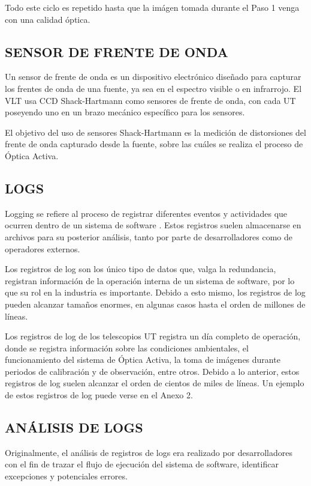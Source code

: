 Todo este ciclo es repetido hasta que la imágen tomada durante el Paso 1 venga con una calidad óptica\cite{wilson1987active}.

\subsection{SENSOR DE FRENTE DE ONDA}
Un sensor de frente de onda es un dispositivo electrónico diseñado para capturar los frentes de onda de una fuente, ya sea en el espectro visible o en infrarrojo. El VLT usa CCD Shack-Hartmann como sensores de frente de onda, con cada UT poseyendo uno en un brazo mecánico específico para los sensores.\cite{eso1998vlt}

El objetivo del uso de sensores Shack-Hartmann es la medición de distorsiones del frente de onda capturado desde la fuente, sobre las cuáles se realiza el proceso de Óptica Activa.\cite{eso1998vlt}

\subsection{LOGS}
Logging se refiere al proceso de registrar diferentes eventos y actividades que ocurren dentro de un sistema de software \cite{jayathilake2011mind}. Estos registros suelen almacenarse en archivos para su posterior análisis, tanto por parte de desarrolladores como de operadores externos.

Los registros de log son los único tipo de datos que, valga la redundancia, registran información de la operación interna de un sistema de software, por lo que su rol en la industria es importante. Debido a esto mismo, los registros de log pueden alcanzar tamaños enormes, en algunas casos hasta el orden de millones de líneas\cite{ma2023automatic}.

Los registros de log de los telescopios UT registra un día completo de operación, donde se registra información sobre las condiciones ambientales, el funcionamiento del sistema de Óptica Activa, la toma de imágenes durante periodos de calibración y de observación, entre otros. Debido a lo anterior, estos registros de log suelen alcanzar el orden de cientos de miles de líneas. Un ejemplo de estos registros de log puede verse en el Anexo 2.

\subsection{ANÁLISIS DE LOGS}
Originalmente, el análisis de registros de logs era realizado por desarrolladores con el fin de trazar el flujo de ejecución del sistema de software, identificar excepciones y potenciales errores. \cite{jayathilake2011mind}

